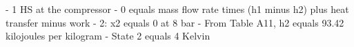 - 1 HS at the compressor
- 0 equals mass flow rate times (h1 minus h2) plus heat transfer minus work
- 2: x2 equals 0 at 8 bar
- From Table A11, h2 equals 93.42 kilojoules per kilogram
- State 2 equals 4 Kelvin
